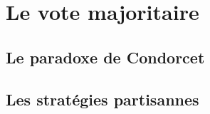 \documentclass[conference]{IEEEtran}
\begin{document}



\section{Le vote majoritaire}
\label{sec:mv}

\subsection{Le paradoxe de Condorcet}

\subsection{Les strat\'egies partisannes}
\end{document}

